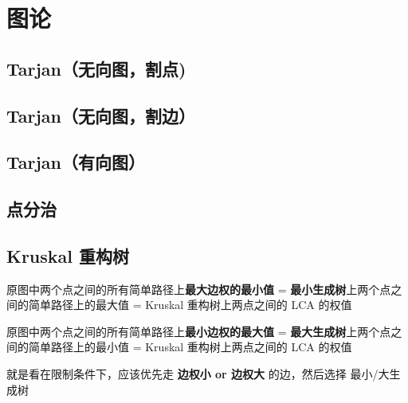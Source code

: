 \documentclass[12pt]{article}
\begin{document}


\newpage

{\centering\section{图论}}

\subsection{Tarjan（无向图，割点)}



\newpage

\subsection{Tarjan（无向图，割边）}



\newpage

\subsection{Tarjan（有向图）}



\newpage

\subsection{点分治}



\newpage

\subsection{Kruskal 重构树}

原图中两个点之间的所有简单路径上\textbf{最大边权的最小值} = \textbf{最小生成树}上两个点之间的简单路径上的最大值 = Kruskal 重构树上两点之间的 LCA 的权值

原图中两个点之间的所有简单路径上\textbf{最小边权的最大值} = \textbf{最大生成树}上两个点之间的简单路径上的最小值 = Kruskal 重构树上两点之间的 LCA 的权值

就是看在限制条件下，应该优先走 \textbf{边权小 or 边权大} 的边，然后选择 最小/大生成树
\end{document}
